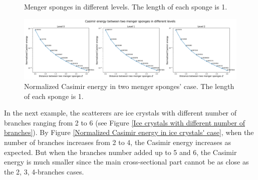 \begin{figure}[H]
    \centering
    \qquad
    \qquad
    \caption{Menger sponges in different levels. The length of each sponge is 1.}
    \label{Menger sponges}
\end{figure}

\begin{figure}[H]
    \centering
    \hspace*{-1.5cm}\includegraphics[width=1.2\textwidth]{figures/Cas_menger_spongers.pdf}
    \caption{Normalized Casimir energy in two menger sponges' case. The length of each sponge is 1.}
    \label{Normalized Casimir energy in two menger sponges' case}
\end{figure}
In the next example, the scatterers are ice crystals with different number of branches ranging from 2 to 6 (see Figure \ref{Ice crystals with different number of branches}).
By Figure \ref{Normalized Casimir energy in ice crystals' case}, when the number of branches increases from 2 to 4, the Casimir energy increases as expected. But 
when the branches number added up to 5 and 6, the Casimir energy is much smaller since the main cross-sectional part cannot be as close as the 
2, 3, 4-branches cases. 

